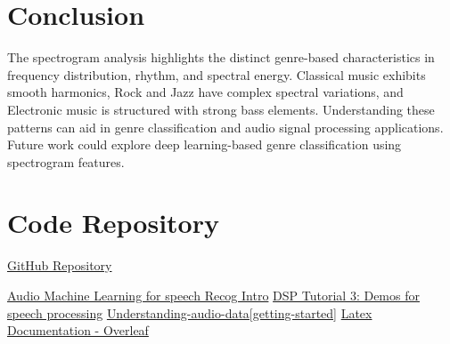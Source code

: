 \documentclass[a4paper,12pt]{article}
\begin{document}
\newpage
\section{Conclusion}
The spectrogram analysis highlights the distinct genre-based characteristics in frequency distribution, rhythm, and spectral energy. Classical music exhibits smooth harmonics, Rock and Jazz have complex spectral variations, and Electronic music is structured with strong bass elements. Understanding these patterns can aid in genre classification and audio signal processing applications. Future work could explore deep learning-based genre classification using spectrogram features.


\newpage
\section{Code Repository}
\href{https://github.com/IITJ-Projects/M23CSA545_PA1.git}{ GitHub Repository}
%
\begin{thebibliography}{9}
     \href{https://www.kaggle.com/code/sujaykapadnis/audio-machine-learning-for-speech-recog-intro}{Audio Machine Learning for speech Recog Intro}
     \href{https://www.kaggle.com/code/jerrypeng/dsp-tutorial-3-demos-for-speech-processing}{DSP Tutorial 3: Demos for speech processing}
     \href{https://www.kaggle.com/code/santoshkumar/understanding-audio-data-getting-started}{Understanding-audio-data[getting-started]}
      \href{https://www.overleaf.com/}{ Latex Documentation - Overleaf}
\end{thebibliography}
\end{document}
